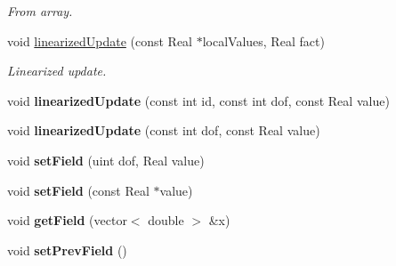 \begin{DoxyCompactItemize}
\begin{DoxyCompactList}\small\item\em From array. \item\end{DoxyCompactList}\item 
\hypertarget{classvoom_1_1_loop_shell_model_a0c3f740abe5307233f348f483120b316}{
void \hyperlink{classvoom_1_1_loop_shell_model_a0c3f740abe5307233f348f483120b316}{linearizedUpdate} (const Real $\ast$localValues, Real fact)}
\label{classvoom_1_1_loop_shell_model_a0c3f740abe5307233f348f483120b316}

\begin{DoxyCompactList}\small\item\em Linearized update. \item\end{DoxyCompactList}\item 
\hypertarget{classvoom_1_1_loop_shell_model_a5b05f2870121f8eae91420bb4a790fad}{
void {\bfseries linearizedUpdate} (const int id, const int dof, const Real value)}
\label{classvoom_1_1_loop_shell_model_a5b05f2870121f8eae91420bb4a790fad}

\item 
\hypertarget{classvoom_1_1_loop_shell_model_a9a7d39bc8e8688e8f850d086b82b63dd}{
void {\bfseries linearizedUpdate} (const int dof, const Real value)}
\label{classvoom_1_1_loop_shell_model_a9a7d39bc8e8688e8f850d086b82b63dd}

\item 
\hypertarget{classvoom_1_1_loop_shell_model_ad546139ca02381d4ea335932cdda98ea}{
void {\bfseries setField} (uint dof, Real value)}
\label{classvoom_1_1_loop_shell_model_ad546139ca02381d4ea335932cdda98ea}

\item 
\hypertarget{classvoom_1_1_loop_shell_model_adcb366bdbbcb21213888515a2aab0e04}{
void {\bfseries setField} (const Real $\ast$value)}
\label{classvoom_1_1_loop_shell_model_adcb366bdbbcb21213888515a2aab0e04}

\item 
\hypertarget{classvoom_1_1_loop_shell_model_a6dd746c4b5a33805f331192ec1ec3e05}{
void {\bfseries getField} (vector$<$ double $>$ \&x)}
\label{classvoom_1_1_loop_shell_model_a6dd746c4b5a33805f331192ec1ec3e05}

\item 
\hypertarget{classvoom_1_1_loop_shell_model_a9e9c7fbc7922ba5c8f03c55d74b3dc80}{
void {\bfseries setPrevField} ()}
\label{classvoom_1_1_loop_shell_model_a9e9c7fbc7922ba5c8f03c55d74b3dc80}


\end{DoxyCompactItemize}
